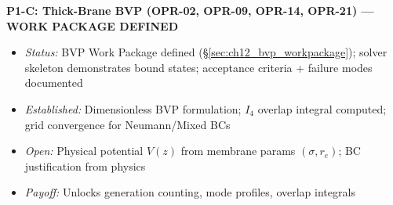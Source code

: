 \begin{tcolorbox}[colback=blue!5, colframe=blue!60!black,
    title=\textbf{OPR Closure Plan: Prioritized Research Program}]
\textbf{P1-C: Thick-Brane BVP (OPR-02, OPR-09, OPR-14, OPR-21) --- WORK PACKAGE DEFINED}
\begin{itemize}[nosep]
    \item \emph{Status:} BVP Work Package defined (\S\ref{sec:ch12_bvp_workpackage}); solver skeleton demonstrates bound states; acceptance criteria + failure modes documented
    \item \emph{Established:} Dimensionless BVP formulation; $I_4$ overlap integral computed; grid convergence for Neumann/Mixed BCs
    \item \emph{Open:} Physical potential $V(z)$ from membrane params $(\sigma, r_e)$; BC justification from physics
    \item \emph{Payoff:} Unlocks generation counting, mode profiles, overlap integrals
\end{itemize}


\end{tcolorbox}
